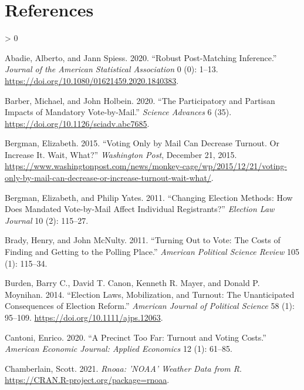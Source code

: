 \documentclass[
  12pt,
]{article}
\newlength{\cslhangindent}
\newenvironment{CSLReferences}[2] %
 {%
  \setlength{\parindent}{0pt}
  \ifodd #1 \everypar{\setlength{\hangindent}{\cslhangindent}}\ignorespaces\fi
  \ifnum #2 > 0
  \setlength{\parskip}{#2\baselineskip}
  \fi
 }%
 {}
\begin{document}
\newpage

\hypertarget{references}{%
\section*{References}\label{references}}

\hypertarget{refs}{}
\begin{CSLReferences}{1}{0}
\leavevmode\hypertarget{ref-Abadie2020}{}%
Abadie, Alberto, and Jann Spiess. 2020. {``Robust {Post}-{Matching Inference}.''} \emph{Journal of the American Statistical Association} 0 (0): 1--13. \url{https://doi.org/10.1080/01621459.2020.1840383}.

\leavevmode\hypertarget{ref-Barber2020}{}%
Barber, Michael, and John Holbein. 2020. {``The Participatory and Partisan Impacts of Mandatory Vote-by-Mail.''} \emph{Science Advances} 6 (35). \url{https://doi.org/10.1126/sciadv.abc7685}.

\leavevmode\hypertarget{ref-Bergman2015}{}%
Bergman, Elizabeth. 2015. {``Voting Only by Mail Can Decrease Turnout. {Or} Increase It. {Wait}, What?''} \emph{Washington Post}, December 21, 2015. \url{https://www.washingtonpost.com/news/monkey-cage/wp/2015/12/21/voting-only-by-mail-can-decrease-or-increase-turnout-wait-what/}.

\leavevmode\hypertarget{ref-Bergman2011}{}%
Bergman, Elizabeth, and Philip Yates. 2011. {``Changing {Election Methods}: {How Does Mandated Vote}-by-{Mail Affect Individual Registrants}?''} \emph{Election Law Journal} 10 (2): 115--27.

\leavevmode\hypertarget{ref-Brady2011}{}%
Brady, Henry, and John McNulty. 2011. {``Turning Out to Vote: {The Costs} of {Finding} and {Getting} to the {Polling Place}.''} \emph{American Political Science Review} 105 (1): 115--34.

\leavevmode\hypertarget{ref-Burden2014}{}%
Burden, Barry C., David T. Canon, Kenneth R. Mayer, and Donald P. Moynihan. 2014. {``Election {Laws}, {Mobilization}, and {Turnout}: {The Unanticipated Consequences} of {Election Reform}.''} \emph{American Journal of Political Science} 58 (1): 95--109. \url{https://doi.org/10.1111/ajps.12063}.

\leavevmode\hypertarget{ref-Cantoni2020}{}%
Cantoni, Enrico. 2020. {``A {Precinct Too Far}: {Turnout} and {Voting Costs}.''} \emph{American Economic Journal: Applied Economics} 12 (1): 61--85.

\leavevmode\hypertarget{ref-Chamberlain2021}{}%
Chamberlain, Scott. 2021. \emph{Rnoaa: '{NOAA}' {Weather Data} from {R}}. \url{https://CRAN.R-project.org/package=rnoaa}.


\end{CSLReferences}
\end{document}
